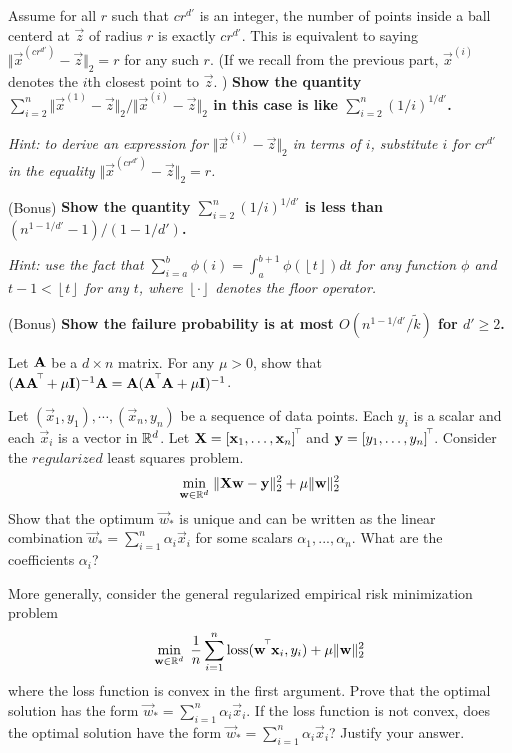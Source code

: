 \documentclass[preview]{standalone}
\begin{document}
\begin{Parts}
Assume for all $r$ such that $cr^{d'}$ is an integer, the number of points inside a ball centerd at $\vec{z}$ of radius $r$ is exactly $cr^{d'}$. This is equivalent to saying $\Vert \vec{x}^{(cr^{d'})}-\vec{z}\Vert_{2}=r$ for any such $r$. (If we recall from the previous part, $\vec{x}^{(i)}$ denotes the $i$th closest point to $\vec{z}$. ) {\bf Show the quantity \\
$\sum_{i=2}^{n}\Vert \vec{x}^{(1)}-\vec{z}\Vert _{2}/\Vert \vec{x}^{(i)}-\vec{z}\Vert _{2}$ in this case is like $\sum_{i=2}^{n}\left(1/i\right)^{1/d'}$.}

\emph{Hint: to derive an expression for $\Vert \vec{x}^{(i)}-\vec{z}\Vert _{2}$ in terms of $i$, substitute $i$ for $cr^{d'}$ in the equality $\Vert \vec{x}^{(cr^{d'})}-\vec{z}\Vert_{2}=r$.}



\Part (Bonus) {\bf Show the quantity $\sum_{i=2}^{n}\left(1/i\right)^{1/d'}$ is less than $(n^{1-1/d'}-1)/\left(1-1/d'\right)$.}

\emph{Hint: use the fact that $\sum_{i=a}^{b}\phi(i)=\int_{a}^{b+1}\phi(\left\lfloor t\right\rfloor)dt$ for any function $\phi$ and $t-1<\left\lfloor t\right\rfloor $ for any $t$, where $\left\lfloor \cdot \right\rfloor$ denotes the floor operator.}



\Part (Bonus) {\bf Show the failure probability is at most $O(n^{1-1/d'}/\tilde{k})$ for $d' \geq 2$.}




\end{Parts}

\begin{Parts}
\Part
Let $\mathbf{A}$ be a $d \times n$  matrix. For any $\mu > 0$, show that $(\mathbf{A}\mathbf{A}^{{}^{\!\top\!}} + \mu \mathbf{I})^{-1}\mathbf{A} = \mathbf{A}(\mathbf{A}^{{}^{\!\top\!}} \mathbf{A} + \mu \mathbf{I})^{-1}$.

\Part Let $(\vec x_1, y_1), \cdots, (\vec x_n, y_n)$ be a sequence of data points. Each $y_i$ is a scalar and each $\vec x_i$ is a vector in $\mathbb{R}^d$. Let $\mathbf{X} = [\boldsymbol{\mathbf{x}}_1, \dots, \boldsymbol{\mathbf{x}}_n]^{{}^{\!\top\!}}$ and $\boldsymbol{\mathbf{y}} = [y_1, \dots, y_n]^{{}^{\!\top\!}}$. Consider the $\textit{regularized}$ least squares problem. \\
  $$ \min_{\boldsymbol{\mathbf{w}} \in \mathbb{R}^d} \;\lVert \mathbf{X}\boldsymbol{\mathbf{w}} - \boldsymbol{\mathbf{y}}\rVert_2^2 + \mu \lVert \boldsymbol{\mathbf{w}}\rVert_2^2$$
Show that the optimum $\vec w_*$ is unique and can be written as the linear combination $\vec w_* = \sum_{i=1}^n \alpha_i \vec x_i$ for some scalars $\alpha_1,...,\alpha_n$. What are the coefficients $\alpha_i$?


\Part
More generally, consider the general regularized empirical risk minimization problem
  $$ \min_{\boldsymbol{\mathbf{w}} \in \mathbb{R}^d} \; \frac{1}{n} \sum_{i=1}^n \text{loss}(\boldsymbol{\mathbf{w}}^{{}^{\!\top\!}} \boldsymbol{\mathbf{x}}_i, y_i)  + \mu \lVert \boldsymbol{\mathbf{w}}\rVert_2^2 $$
where the loss function is convex in the first argument. Prove that the optimal solution
has the form $\vec w_* = \sum_{i=1}^n \alpha_i \vec x_i$.
If the loss function is not convex, does the optimal solution have the form $\vec w_* = \sum_{i=1}^n \alpha_i \vec x_i$? Justify your answer.



\end{Parts}
\end{document}
